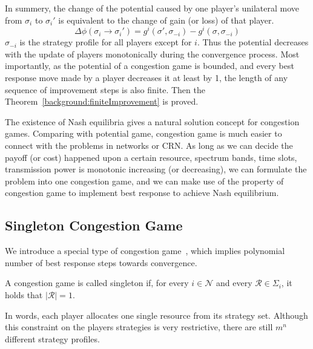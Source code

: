 In summery, the change of the potential caused by one player's unilateral move from $\sigma_i$ to $\sigma_i'$ is equivalent to the change of gain (or loss) of that player.
\begin{equation}
\label{5}
\varDelta \phi(\sigma_i \rightarrow \sigma_i') = g^i(\sigma',\sigma_{-i}) - g^i(\sigma,\sigma_{-i})
\end{equation}
$\sigma_{-i}$ is the strategy profile for all players except for $i$.
Thus the potential decreases with the update of players monotonically during the convergence process.
Most importantly, as the potential of a congestion game is bounded, and every best response move made by a player decreases it at least by 1, the length of any sequence of improvement steps is also finite.
Then the Theorem~\ref{background:finiteImprovement} is proved.



The existence of Nash equilibria gives a natural solution concept for congestion games.
Comparing with potential game, congestion game is much easier to connect with the problems in networks or CRN.
As long as we can decide the payoff (or cost) happened upon a certain resource, \ie spectrum bands, time slots, transmission power is monotonic increasing (or decreasing), we can formulate the problem into one congestion game, and we can make use of the property of congestion game to implement best response to achieve Nash equilibrium.



\subsection{Singleton Congestion Game}
\label{singleton_congestion_game}
We introduce a special type of congestion game~\cite{aaai_IeongMNSS05}, which implies polynomial number of best response steps towards convergence.


\begin{mydef}
\label{background:singleton}
A congestion game is called singleton if, for every $i\in \mathcal{N}$ and every $\mathcal{R}\in \Sigma_i$, it holds that $|\mathcal{R}|=1$.
\end{mydef}
In words, each player allocates one single resource from its strategy set.
Although this constraint on the players strategies is very restrictive, there are still $m^n$ different strategy profiles.

